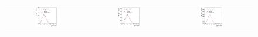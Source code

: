 \begin{figure}[ht]
  \centering
  \begin{tabular}{ccc}
    \includegraphics[width=0.3\textwidth]{figures/ResFit_Spring10QCDFlat_Gauss_Eta0_Spectrum_PtBin1} &
    \includegraphics[width=0.3\textwidth]{figures/ResFit_Spring10QCDFlat_Gauss_Eta0_Spectrum_PtBin2} &
    \includegraphics[width=0.3\textwidth]{figures/ResFit_Spring10QCDFlat_Gauss_Eta0_Spectrum_PtBin3} \\


\end{tabular}
\end{figure}
